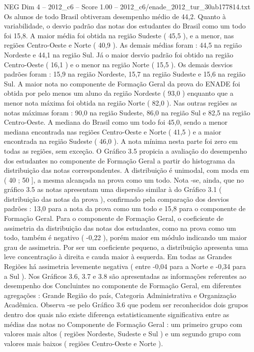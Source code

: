 \begin{textsample}{NEG Dim 4 – 2012\_c6 – Score 1.00 – 2012\_c6/enade\_2012\_tur\_30ab177814.txt}
Os alunos de todo Brasil obtiveram desempenho médio de 44,2.
Quanto à variabilidade, o desvio padrão das notas dos estudantes do Brasil como um todo foi 15,8.
A maior média foi obtida na região Sudeste ( 45,5 ), e a menor, nas regiões Centro-Oeste e Norte ( 40,9 ).
As demais médias foram : 44,5 na região Nordeste e 44,1 na região Sul.
Já o maior desvio padrão foi obtido na região Centro-Oeste ( 16,1 ) e o menor na região Norte ( 15,5 ).
Os demais desvios padrões foram : 15,9 na região Nordeste, 15,7 na região Sudeste e 15,6 na região Sul.
A maior nota no componente de Formação Geral da prova do ENADE foi obtida por pelo menos um aluno da região Nordeste ( 93,0 ) enquanto que a menor nota máxima foi obtida na região Norte ( 82,0 ).
Nas outras regiões as notas máximas foram : 90,0 na região Sudeste, 86,0 na região Sul e 82,5 na região Centro-Oeste.
A mediana do Brasil como um todo foi 45,0, sendo a menor mediana encontrada nas regiões Centro-Oeste e Norte ( 41,5 ) e a maior encontrada na região Sudeste ( 46,0 ).
A nota mínima nesta parte foi zero em todas as regiões, sem exceção.
O Gráfico 3.5 propicia a avaliação do desempenho dos estudantes no componente de Formação Geral a partir do histograma da distribuição das notas correspondentes.
A distribuição é unimodal, com moda em ( 40 ; 50 ], a mesma alcançada na prova como um todo.
Nota -se, ainda, que no gráfico 3.5 as notas apresentam uma dispersão similar à do Gráfico 3.1 ( distribuição das notas da prova ), confirmado pela comparação dos desvios padrões : 13,0 para a nota da prova como um todo e 15,8 para o componente de Formação Geral.
Para o componente de Formação Geral, o coeficiente de assimetria da distribuição das notas dos estudantes, como na prova como um todo, também é negativo ( -0,22 ), porém maior em módulo indicando um maior grau de assimetria.
Por ser um coeficiente pequeno, a distribuição apresenta uma leve concentração à direita e cauda maior à esquerda.
Em todas as Grandes Regiões há assimetria levemente negativa ( entre -0,04 para a Norte e -0,34 para a Sul ).
Nos Gráficos 3.6, 3.7 e 3.8 são apresentadas as informações referentes ao desempenho dos Concluintes no componente de Formação Geral, em diferentes agregações : Grande Região do país, Categoria Administrativa e Organização Acadêmica.
Observa -se pelo Gráfico 3.6 que podem ser reconhecidos dois grupos dentro dos quais não existe diferença estatisticamente significativa entre as médias das notas no Componente de Formação Geral : um primeiro grupo com valores mais altos ( regiões Nordeste, Sudeste e Sul ) e um segundo grupo com valores mais baixos ( regiões Centro-Oeste e Norte ).

\end{textsample}
